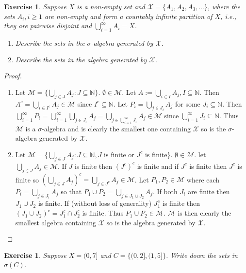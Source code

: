 \documentclass{article}
\newtheorem{exercise}[theorem]{Exercise}
\begin{document}
\begin{exercise}
    Suppose $X$ is a non-empty set and $\mathcal{X} = \{A_1, A_2, A_3, \ldots\}$, where the sets $A_i, i \geq 1$ are non-empty and form a countably infinite partition of $X$, i.e., they are pairwise disjoint and $\bigcup_{i=1}^{\infty} A_i = X$.
    \begin{enumerate}
        \item Describe the sets in the $\sigma$-algebra generated by $\mathcal{X}$.
        \item Describe the sets in the algebra generated by $\mathcal{X}$.
    \end{enumerate}
\end{exercise}
\begin{proof}
\begin{enumerate}
    \item Let $\mathcal{M}=\{\bigcup_{j\in J}A_j:J\subseteq\mathbb{N}\}$. $\emptyset\in\mathcal{M}$. Let $A:=\bigcup_{i\in I}A_j,I\subseteq\mathbb{N}$. Then $A^c=\bigcup_{i\in I^c}A_j\in\mathcal{M}$ since $I^c\subseteq\mathbb{N}$. Let $P_i=\bigcup_{j\in J_i}A_j$ for some $J_i\subseteq\mathbb{N}$. Then $\bigcup_{i=1}^\infty P_i=\bigcup_{i=1}^\infty\bigcup_{j\in J_i}A_j=\bigcup_{j\in\bigcup_{i=1}^\infty J_i}A_j\in\mathcal{M}$ since $\bigcup_{i=1}^\infty J_i\subseteq\mathbb{N}$. Thus $\mathcal{M}$ is a $\sigma$-algebra and is clearly the smallest one containing $\mathcal{X}$ so is the $\sigma$-algebra generated by $\mathcal{X}$.
    \item Let $\mathcal{M}=\{\bigcup_{j\in J}A_j:J\subseteq\mathbb{N},J\text{ is finite or }J^c\text{ is finite}\}$. $\emptyset\in\mathcal{M}$. let $\bigcup_{j\in J}A_j\in\mathcal{M}$. If $J$ is finite then $(J^c)^c$ is finite and if $J^c$ is finite then $J^c$ is finite so $(\bigcup_{j\in J}A_j)^c=\bigcup_{j\in J^c}A_j\in\mathcal{M}$. Let $P_1,P_2\in\mathcal{M}$ where each $P_i=\bigcup_{j\in J_i}A_j$ so that $P_1\cup P_2=\bigcup_{j\in J_1\cup J_2}A_j$. If both $J_i$ are finite then $J_1\cup J_2$ is finite. If (without loss of generality) $J_1^c$ is finite then $(J_1\cup J_2)^c=J_1^c\cap J_2^c$ is finite. Thus $P_1\cup P_2\in\mathcal{M}$. $\mathcal{M}$ is then clearly the smallest algebra containing $\mathcal{X}$ so is the algebra generated by $\mathcal{X}$.
\end{enumerate}
\end{proof}
\begin{exercise}
Suppose $X = (0, 7]$ and $C = \{(0, 2], (1, 5]\}$. Write down the sets in $\sigma(C)$.
\end{exercise}
\end{document}
